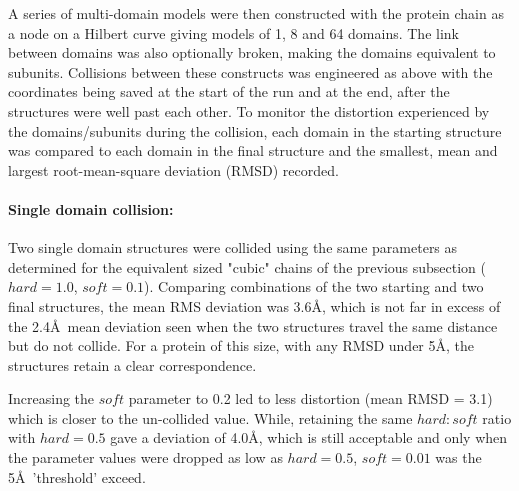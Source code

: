 A series of multi-domain models were then constructed with the protein chain as a
node on a Hilbert curve giving models of 1, 8 and 64 domains.   The link between 
domains was also optionally broken, making the domains equivalent to subunits.
Collisions between these constructs was engineered as above with the coordinates
being saved at the start of the run and at the end, after the structures were well
past each other.    To monitor the distortion experienced by the domains/subunits
during the collision, each domain in the starting structure was compared to each
domain in the final structure and the smallest, mean and largest root-mean-square
deviation (RMSD) recorded. 

\paragraph{Single domain collision:\\}

Two single domain structures were collided using the same parameters as determined
for the equivalent sized "cubic" chains of the previous subsection ($hard = 1.0$, $soft = 0.1$).
Comparing combinations of the two starting and two final structures, the mean RMS
deviation was 3.6\AA , which is not far in excess of the 2.4\AA\ mean deviation seen
when the two structures travel the same distance but do not collide.   For a protein
of this size, with any RMSD under 5\AA, the structures retain a clear correspondence. 

Increasing the $soft$ parameter to 0.2 led to less distortion (mean RMSD = 3.1) which
is closer to the un-collided value.   While, retaining the same $hard:soft$ ratio
with $hard = 0.5$ gave a deviation of 4.0\AA, which is still acceptable and only
when the parameter values were dropped as low as $hard = 0.5$, $soft = 0.01$ was the
5\AA\ 'threshold' exceed.  

